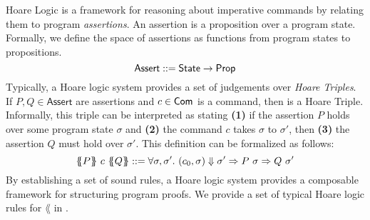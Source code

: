 \documentclass[p.tex]{subfiles}
\begin{document}
Hoare Logic is a framework for reasoning about imperative commands by
relating them to program \emph{assertions}.
An assertion is a proposition over a program state. Formally, we
define the space of assertions as functions from program states to
propositions.
\[ \textsf{Assert} ::= \textsf{State} \rightarrow \textsf{Prop} \]
Typically, a Hoare logic system provides a set of judgements over
\emph{Hoare Triples}.
If $P, Q \in \textsf{Assert}$ are assertions and $c \in \textsf{Com}$ is a
command, then  is a Hoare Triple.
%
Informally, this triple can be interpreted as stating \textbf{(1)} if
the assertion $P$ holds over some program state $\sigma$ and
\textbf{(2)} the command $c$ takes $\sigma$ to $\sigma'$, then
\textbf{(3)} the assertion $Q$ must hold over $\sigma'$.
%
This definition can be formalized as follows:
\[
  \hoare{P}{c}{Q} ::= \forall \sigma,
  \sigma'.~\ceval{c_0}{\sigma}{\sigma'} \Rightarrow P~\sigma \Rightarrow Q~\sigma'
\]
By establishing a set of sound rules, a Hoare logic system provides a
composable framework for structuring program proofs.
We provide a set of typical Hoare logic rules for $\lang$ in
.
\end{document}
